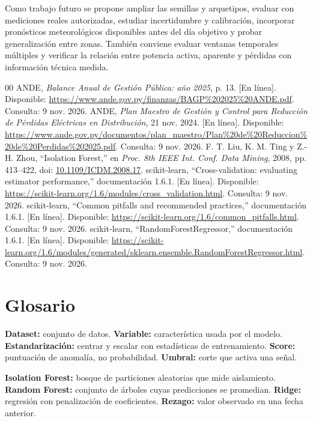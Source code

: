 \documentclass[conference]{IEEEtran}
\begin{document}
Como trabajo futuro se propone ampliar las semillas y arquetipos, evaluar con mediciones reales autorizadas, estudiar incertidumbre y calibración, incorporar pronósticos meteorológicos disponibles antes del día objetivo y probar generalización entre zonas. También conviene evaluar ventanas temporales múltiples y verificar la relación entre potencia activa, aparente y pérdidas con información técnica medida.
\begin{thebibliography}{00}
 ANDE, \emph{Balance Anual de Gestión Pública: año 2025}, p. 13. [En línea]. Disponible: \url{https://www.ande.gov.py/finanzas/BAGP%202025%20ANDE.pdf}. Consulta: 9 nov. 2026.
 ANDE, \emph{Plan Maestro de Gestión y Control para Reducción de Pérdidas Eléctricas en Distribución}, 21 nov. 2024. [En línea]. Disponible: \url{https://www.ande.gov.py/documentos/plan_maestro/Plan%20de%20Reduccion%20de%20Perdidas%202025.pdf}. Consulta: 9 nov. 2026.
 F. T. Liu, K. M. Ting y Z.-H. Zhou, \textquotedblleft Isolation Forest,\textquotedblright{} en \emph{Proc. 8th IEEE Int. Conf. Data Mining}, 2008, pp. 413--422, doi: \href{https://doi.org/10.1109/ICDM.2008.17}{10.1109/ICDM.2008.17}.
 scikit-learn, \textquotedblleft Cross-validation: evaluating estimator performance,\textquotedblright{} documentación 1.6.1. [En línea]. Disponible: \url{https://scikit-learn.org/1.6/modules/cross_validation.html}. Consulta: 9 nov. 2026.
 scikit-learn, \textquotedblleft Common pitfalls and recommended practices,\textquotedblright{} documentación 1.6.1. [En línea]. Disponible: \url{https://scikit-learn.org/1.6/common_pitfalls.html}. Consulta: 9 nov. 2026.
 scikit-learn, \textquotedblleft RandomForestRegressor,\textquotedblright{} documentación 1.6.1. [En línea]. Disponible: \url{https://scikit-learn.org/1.6/modules/generated/sklearn.ensemble.RandomForestRegressor.html}. Consulta: 9 nov. 2026.
\end{thebibliography}
\section*{Glosario}
\textbf{Dataset:} conjunto de datos. \textbf{Variable:} característica usada por el modelo. \textbf{Estandarización:} centrar y escalar con estadísticas de entrenamiento. \textbf{Score:} puntuación de anomalía, no probabilidad. \textbf{Umbral:} corte que activa una señal.

\textbf{Isolation Forest:} bosque de particiones aleatorias que mide aislamiento. \textbf{Random Forest:} conjunto de árboles cuyas predicciones se promedian. \textbf{Ridge:} regresión con penalización de coeficientes. \textbf{Rezago:} valor observado en una fecha anterior.
\end{document}
